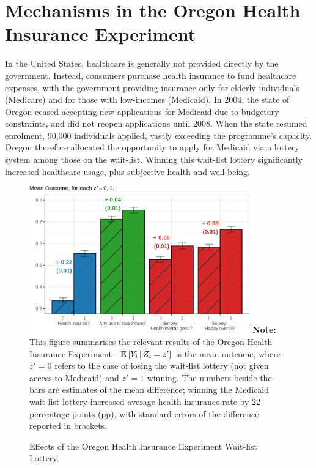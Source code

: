 \section{Mechanisms in the Oregon Health Insurance Experiment}
\label{sec:lottery}
In the United States, healthcare is generally not provided directly by the government.
Instead, consumers purchase health insurance to fund healthcare expenses, with the government providing insurance only for elderly individuals (Medicare) and for those with low-incomes (Medicaid).
In 2004, the state of Oregon ceased accepting new applications for Medicaid due to budgetary constraints, and did not reopen applications until 2008.
When the state resumed enrolment, 90,000 individuals applied, vastly exceeding the programme's capacity.
Oregon therefore allocated the opportunity to apply for Medicaid via a lottery system among those on the wait-list.
Winning this wait-list lottery significantly increased healthcare usage, plus subjective health and well-being.

\begin{figure}[!htbp]
    \caption{Effects of the Oregon Health Insurance Experiment Wait-list Lottery.}
    \centering
    \includegraphics[width=0.85\textwidth]{sections/figures/insurance-effects.png}
    \label{fig:healthinsurance-effects}
    \justify
    \footnotesize    
    \textbf{Note:}
    This figure summarises the relevant results of the Oregon Health Insurance Experiment \citep{finkelstein2008oregon}.
    $\mathbb{E}_{} \left[ Y_i \, \middle\vert \, Z_i = z' \right]$ is the mean outcome, where $z' = 0$ refers to the case of losing the wait-list lottery (not given access to Medicaid) and $z' = 1$ winning.
    The numbers beside the bars are estimates of the mean difference; winning the Medicaid wait-list lottery increased average health insurance rate by 22 percentage points (pp), with standard errors of the difference reported in brackets.
\end{figure}

